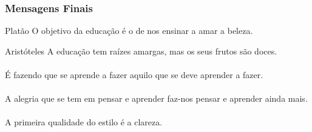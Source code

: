 \documentclass[aspectratio=169]{beamer}
\begin{document}

\begin{frame}\frametitle{Mensagens Finais}
	\begin{block}{Plat\~ao}
		O objetivo da educação é o de nos ensinar a amar a beleza.
	\end{block}
	\begin{block}{Aristóteles}
		A educação tem raízes amargas, mas os seus frutos são doces.\\
		~\\
		É fazendo que se aprende a fazer aquilo que se deve aprender a fazer.\\
		~\\
		A alegria que se tem em pensar e aprender faz-nos pensar e aprender ainda mais.\\
		~\\
		A primeira qualidade do estilo é a clareza.
	\end{block}
\end{frame}
\end{document}
